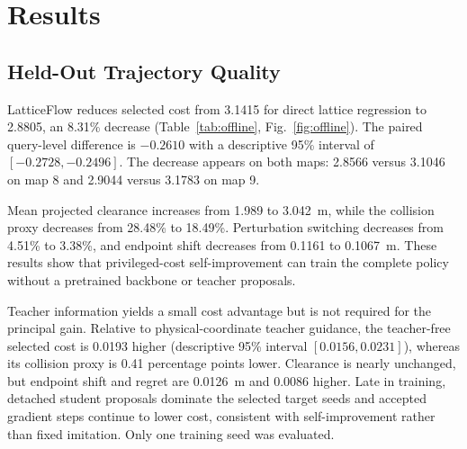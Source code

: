 \section{Results}

\subsection{Held-Out Trajectory Quality}

LatticeFlow reduces selected cost from 3.1415 for direct lattice regression to 2.8805, an 8.31\% decrease (Table~\ref{tab:offline}, Fig.~\ref{fig:offline}). The paired query-level difference is $-0.2610$ with a descriptive 95\% interval of $[-0.2728,-0.2496]$. The decrease appears on both maps: 2.8566 versus 3.1046 on map 8 and 2.9044 versus 3.1783 on map 9.

Mean projected clearance increases from 1.989 to 3.042~m, while the collision proxy decreases from 28.48\% to 18.49\%. Perturbation switching decreases from 4.51\% to 3.38\%, and endpoint shift decreases from 0.1161 to 0.1067~m. These results show that privileged-cost self-improvement can train the complete policy without a pretrained backbone or teacher proposals.

\begin{table}[t]
\caption{Held-out maps 8--9. T: teacher-guided diagnostic. Lower is better except clearance.}
\label{tab:offline}
\centering
\small
{}
\end{table}

Teacher information yields a small cost advantage but is not required for the principal gain. Relative to physical-coordinate teacher guidance, the teacher-free selected cost is 0.0193 higher (descriptive 95\% interval $[0.0156,0.0231]$), whereas its collision proxy is 0.41 percentage points lower. Clearance is nearly unchanged, but endpoint shift and regret are 0.0126~m and 0.0086 higher. Late in training, detached student proposals dominate the selected target seeds and accepted gradient steps continue to lower cost, consistent with self-improvement rather than fixed imitation. Only one training seed was evaluated.

